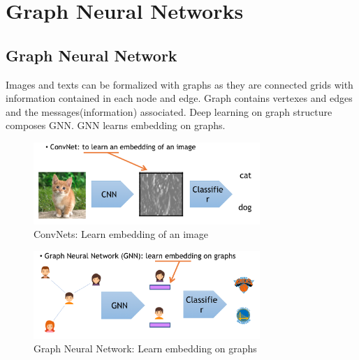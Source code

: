 \chapter{Graph Neural Networks}

\section{Graph Neural Network}
Images and texts can be formalized with graphs as they are connected grids with information contained in each node and edge. Graph contains vertexes and edges and the messages(information) associated. Deep learning on graph structure composes GNN. GNN learns embedding on graphs. 

\begin{figure}[ht]
\begin{center}
  \includegraphics[width=3.38in]{labs/14/images/Embedding_ConvNet.png}
\end{center}
   \caption{ConvNets: Learn embedding of an image}
\label{fig:CV}
\end{figure}

\begin{figure}[ht]
\begin{center}
  \includegraphics[width=3.38in]{labs/14/images/Embedding_Graph.png}
\end{center}
   \caption{Graph Neural Network: Learn embedding on graphs}
\label{fig:CV}
\end{figure}

